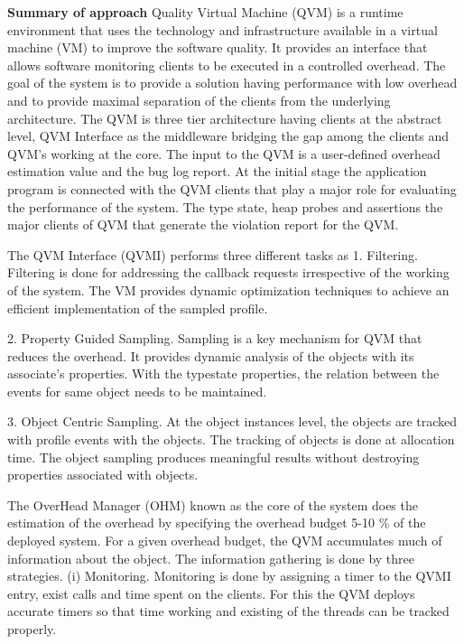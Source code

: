 \begin{compactitem}
\item[\textbf{Summary of approach}] Quality Virtual Machine (QVM) is a runtime environment that uses the technology and infrastructure available in a virtual machine (VM) to improve the software quality. It provides an interface that allows software monitoring clients to be executed in a controlled overhead. The goal of the system is to provide a solution having performance with low overhead and to provide maximal separation of the clients from the underlying architecture. The QVM is three tier architecture having clients at the abstract level, QVM Interface as the middleware bridging the gap among the clients and QVM’s working at the core. The input to the QVM is a user-defined overhead estimation value and the bug log report. At the initial stage the application program is connected with the QVM clients that play a major role for evaluating the performance of the system. The type state, heap probes and assertions the major clients of QVM that generate the violation report for the QVM. 

The QVM Interface (QVMI) performs three different tasks as 
1. Filtering. Filtering is done for addressing the callback requests irrespective of the working of the system. The VM provides dynamic optimization techniques to achieve an efficient implementation of the sampled profile.

2.	Property Guided Sampling. Sampling is a key mechanism for QVM that reduces the overhead. It provides dynamic analysis of the objects with its associate’s properties. With the typestate properties, the relation between the events for same object needs to be maintained.

3.	Object Centric Sampling.     At the object instances level, the objects are tracked with profile events with the objects. The tracking of objects is done at allocation time. The object sampling produces meaningful results without destroying properties associated with objects.

The OverHead Manager (OHM) known as the core of the system does the estimation of the overhead by specifying the overhead budget 5-10 \% of the deployed system. For a given overhead budget, the QVM accumulates much of information about the object. The information gathering is done by three strategies. (i)	Monitoring. Monitoring is done by assigning a timer to the QVMI entry, exist calls and time spent on the clients. For this the QVM deploys accurate timers so that time working and existing of the threads can be tracked properly.


\end{compactitem}
